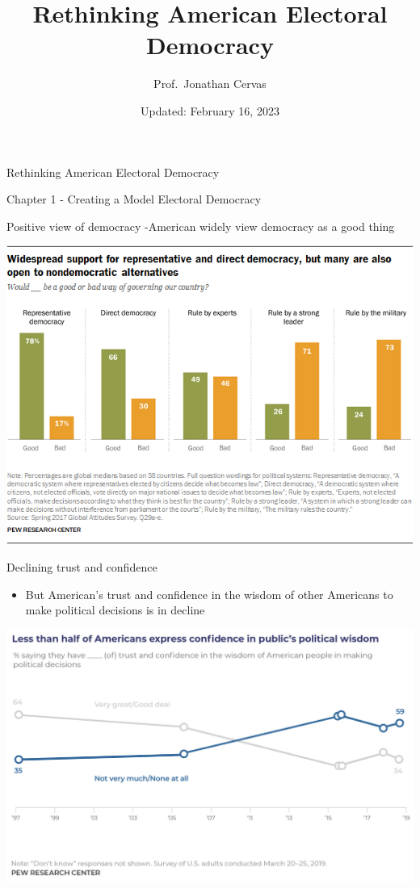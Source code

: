 \documentclass[
  ignorenonframetext,
  aspectratio=169]{beamer}
\title{Rethinking American Electoral Democracy}
\author{Prof.~Jonathan Cervas}
\date{Updated: February 16, 2023}
\providecommand{\tightlist}{%
  \setlength{\itemsep}{0pt}\setlength{\parskip}{0pt}}
\begin{document}
\frame{\titlepage}

\begin{frame}{Rethinking American Electoral Democracy}
\protect\hypertarget{rethinking-american-electoral-democracy}{}
\end{frame}

\begin{frame}{Chapter 1 - Creating a Model Electoral Democracy}
\protect\hypertarget{chapter-1---creating-a-model-electoral-democracy}{}
\end{frame}

\begin{frame}{Positive view of democracy}
\protect\hypertarget{positive-view-of-democracy}{}
-American widely view democracy as a good thing

\includegraphics{img/demo-support.png}
\end{frame}

\begin{frame}{Declining trust and confidence}
\protect\hypertarget{declining-trust-and-confidence}{}
\begin{itemize}
\tightlist
\item
  But American's trust and confidence in the wisdom of other Americans
  to make political decisions is in decline
\end{itemize}

\includegraphics{img/demo-americans.png}
\end{frame}
\end{document}
